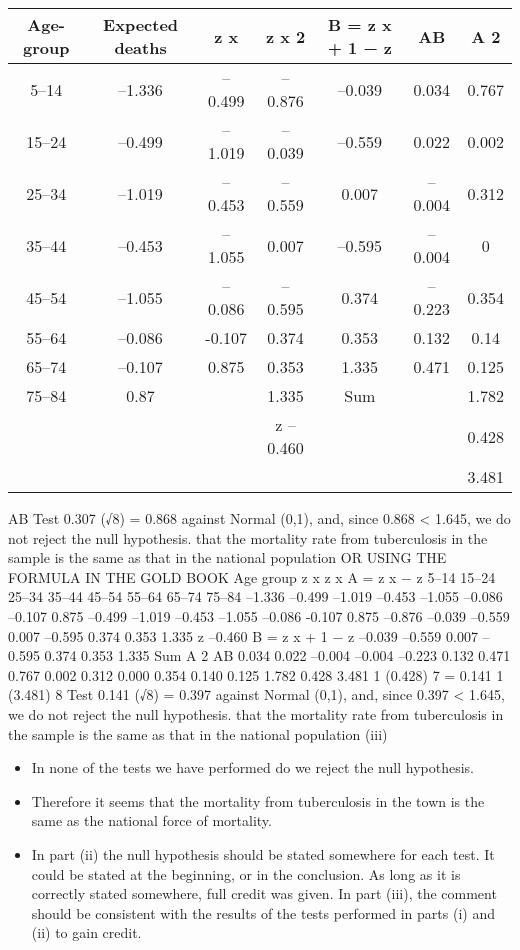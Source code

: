 \documentclass[a4paper,12pt]{article}
\begin{document}
\begin{enumerate}
\begin{center}
\begin{tabular}{|c|c|c|c|c|c|c|}
Age-group	&	 Expected deaths	&	 z x 	&	z x 2	&	B = z x + 1 − z	&	AB	&	A 2	\\ \hline
5–14	&	–1.336	&	–0.499	&	–0.876	&	–0.039	&	0.034	&	0.767	\\ \hline
15–24	&	–0.499	&	–1.019	&	–0.039	&	–0.559	&	0.022	&	0.002	\\ \hline
25–34	&	–1.019	&	–0.453	&	–0.559	&	0.007	&	–0.004	&	0.312	\\ \hline
35–44	&	–0.453	&	–1.055	&	0.007	&	–0.595	&	–0.004	&	0	\\ \hline
45–54	&	–1.055	&	–0.086	&	–0.595	&	0.374	&	–0.223	&	0.354	\\ \hline
55–64	&	–0.086	&	-0.107	&	0.374	&	0.353	&	0.132	&	0.14	\\ \hline
65–74	&	–0.107	&	0.875	&	0.353	&	1.335	&	0.471	&	0.125	\\ \hline
75–84 	&	0.87	&		&	1.335	&	Sum	&		&	1.782	\\ \hline
	&		&		&	z –0.460	&		&		&	0.428	\\ \hline
	&		&		&		&		&		&	3.481	\\ \hline
\end{tabular}
\end{center}


AB
Test 0.307 (√8) = 0.868 against Normal (0,1), and, since
0.868 < 1.645, we do not reject the null hypothesis.
that the mortality rate from tuberculosis in the sample is the same as that in the
national population
OR USING THE FORMULA IN THE GOLD BOOK
Age
group z x z x A = z x − z
5–14
15–24
25–34
35–44
45–54
55–64
65–74
75–84 –1.336
–0.499
–1.019
–0.453
–1.055
–0.086
–0.107
0.875 –0.499
–1.019
–0.453
–1.055
–0.086
-0.107
0.875 –0.876
–0.039
–0.559
0.007
–0.595
0.374
0.353
1.335
z –0.460
B = z x + 1 − z
–0.039
–0.559
0.007
–0.595
0.374
0.353
1.335
Sum
A 2
AB
0.034
0.022
–0.004
–0.004
–0.223
0.132
0.471 0.767
0.002
0.312
0.000
0.354
0.140
0.125
1.782
0.428 3.481
1
(0.428)
7
= 0.141
1
(3.481)
8
Test 0.141 (√8) = 0.397 against Normal (0,1), and, since
0.397 < 1.645, we do not reject the null hypothesis.
that the mortality rate from tuberculosis in the sample is the same as that in the national population
(iii)

\begin{itemize}
\item In none of the tests we have performed do we reject the null hypothesis.
\item Therefore it seems that the mortality from tuberculosis in the town is the same as the national force of mortality.
\item In part (ii) the null hypothesis should be stated somewhere for each test. It could be stated at
the beginning, or in the conclusion. As long as it is correctly stated somewhere, full credit was given. In part (iii), the comment should be consistent with the results of the tests performed in parts (i) and (ii) to gain credit.
\end{itemize}


\end{enumerate}
\end{document}
